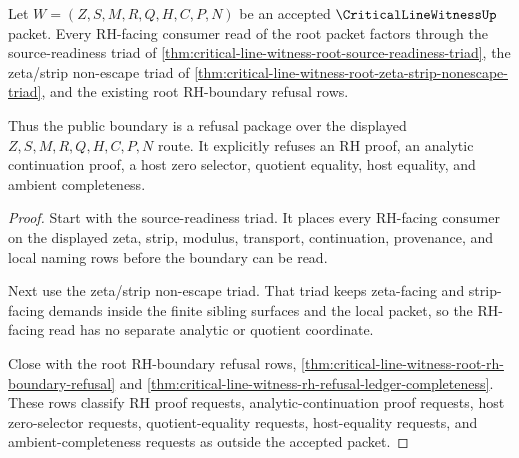 \begin{theorem}
\label{thm:critical-line-witness-root-rh-refusal-boundary}
Let $W=(Z,S,M,R,Q,H,C,P,N)$ be an accepted $\CriticalLineWitnessUp$ packet.
Every RH-facing consumer read of the root packet factors through the
source-readiness triad of
\autoref{thm:critical-line-witness-root-source-readiness-triad}, the
zeta/strip non-escape triad of
\autoref{thm:critical-line-witness-root-zeta-strip-nonescape-triad}, and the
existing root RH-boundary refusal rows.

Thus the public boundary is a refusal package over the displayed
$Z,S,M,R,Q,H,C,P,N$ route. It explicitly refuses an RH proof, an analytic
continuation proof, a host zero selector, quotient equality, host equality,
and ambient completeness.
\end{theorem}
\begin{proof}
Start with the source-readiness triad. It places every RH-facing consumer on
the displayed zeta, strip, modulus, transport, continuation, provenance, and
local naming rows before the boundary can be read.

Next use the zeta/strip non-escape triad. That triad keeps zeta-facing and
strip-facing demands inside the finite sibling surfaces and the local packet,
so the RH-facing read has no separate analytic or quotient coordinate.

Close with the root RH-boundary refusal rows,
\autoref{thm:critical-line-witness-root-rh-boundary-refusal} and
\autoref{thm:critical-line-witness-rh-refusal-ledger-completeness}. These
rows classify RH proof requests, analytic-continuation proof requests, host
zero-selector requests, quotient-equality requests, host-equality requests,
and ambient-completeness requests as outside the accepted packet.
\end{proof}

